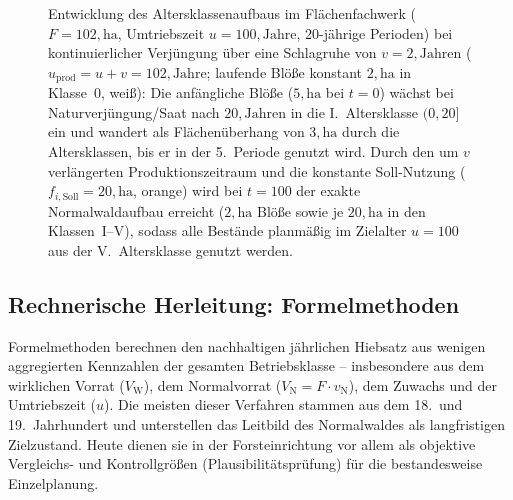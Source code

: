 \documentclass[twocolumn, paper=a4, fontsize=10pt]{scrartcl}
\begin{document}
\begin{figure}[!htbp]
{}
\caption{Entwicklung des Altersklassenaufbaus im Flächenfachwerk ($F = 102,\text{ha}$, Umtriebszeit $u = 100,\text{Jahre}$, $20$-jährige Perioden) bei kontinuierlicher Verjüngung über eine Schlagruhe von $v = 2,\text{Jahren}$ ($u_{\text{prod}} = u + v = 102,\text{Jahre}$; laufende Blöße konstant $2,\text{ha}$ in Klasse~0, weiß): Die anfängliche Blöße ($5,\text{ha}$ bei $t = 0$) wächst bei Naturverjüngung/Saat nach $20,\text{Jahren}$ in die I.~Altersklasse $(0, 20]$ ein und wandert als Flächenüberhang von $3,\text{ha}$ durch die Altersklassen, bis er in der 5.~Periode genutzt wird. Durch den um $v$ verlängerten Produktionszeitraum und die konstante Soll-Nutzung ($f_{i,\text{Soll}} = 20,\text{ha}$, orange) wird bei $t = 100$ der exakte Normalwaldaufbau erreicht ($2,\text{ha}$ Blöße sowie je $20,\text{ha}$ in den Klassen~I--V), sodass alle Bestände planmäßig im Zielalter $u = 100$ aus der V.~Altersklasse genutzt werden.}
\label{fig:fachwerk_entwicklung}
\end{figure}

\subsection{Rechnerische Herleitung: Formelmethoden}

Formelmethoden berechnen den nachhaltigen jährlichen Hiebsatz aus wenigen aggregierten Kennzahlen der gesamten Betriebsklasse -- insbesondere aus dem wirklichen Vorrat ($V_{\text{W}}$), dem Normalvorrat ($V_{\text{N}} = F \cdot v_{\text{N}}$), dem Zuwachs und der Umtriebszeit ($u$). Die meisten dieser Verfahren stammen aus dem 18.~und 19.~Jahrhundert und unterstellen das Leitbild des Normalwaldes als langfristigen Zielzustand. Heute dienen sie in der Forsteinrichtung vor allem als objektive Vergleichs- und Kontrollgrößen (Plausibilitätsprüfung) für die bestandesweise Einzelplanung.
\end{document}
